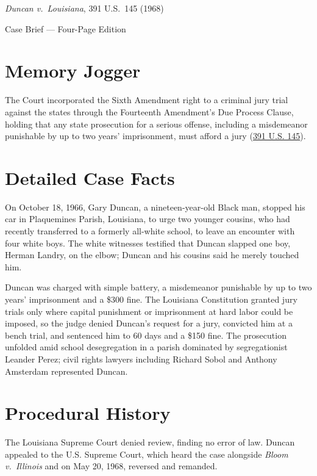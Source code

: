 \documentclass[12pt]{article}
\begin{document}
\begin{center}
{\LARGE \textit{Duncan v.\ Louisiana}, 391 U.S.\ 145 (1968)\par}
\vspace{0.8em}
{\large Case Brief --- Four-Page Edition\par}
\end{center}
\vspace{1em}

\section{Memory Jogger}

The Court incorporated the Sixth Amendment right to a criminal jury trial against the states through the Fourteenth Amendment's Due Process Clause, holding that any state prosecution for a serious offense, including a misdemeanor punishable by up to two years' imprisonment, must afford a jury (\href{https://supreme.justia.com/cases/federal/us/391/145/}{391 U.S. 145}).

\section{Detailed Case Facts}

On October 18, 1966, Gary Duncan, a nineteen-year-old Black man, stopped his car in Plaquemines Parish, Louisiana, to urge two younger cousins, who had recently transferred to a formerly all-white school, to leave an encounter with four white boys. The white witnesses testified that Duncan slapped one boy, Herman Landry, on the elbow; Duncan and his cousins said he merely touched him.

Duncan was charged with simple battery, a misdemeanor punishable by up to two years' imprisonment and a \$300 fine. The Louisiana Constitution granted jury trials only where capital punishment or imprisonment at hard labor could be imposed, so the judge denied Duncan's request for a jury, convicted him at a bench trial, and sentenced him to 60 days and a \$150 fine. The prosecution unfolded amid school desegregation in a parish dominated by segregationist Leander Perez; civil rights lawyers including Richard Sobol and Anthony Amsterdam represented Duncan.

\section{Procedural History}

The Louisiana Supreme Court denied review, finding no error of law. Duncan appealed to the U.S. Supreme Court, which heard the case alongside \textit{Bloom v.\ Illinois} and on May 20, 1968, reversed and remanded.
\end{document}
